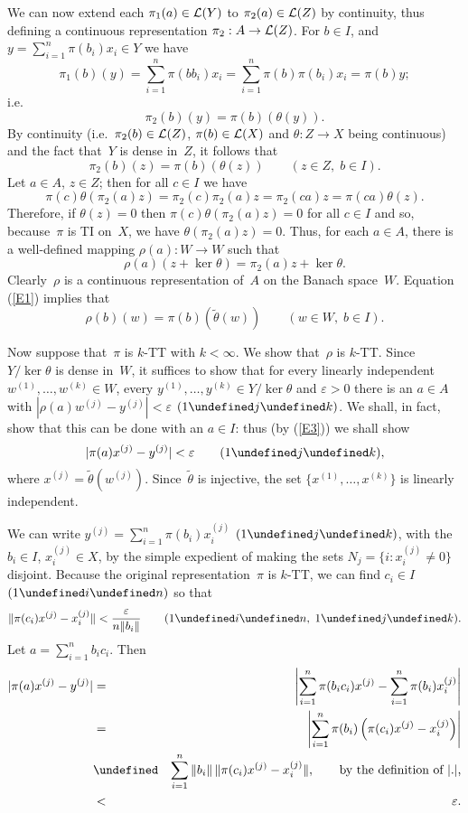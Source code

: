 \documentclass[11pt]{article}
\newcommand{\ie}{i.e.\ }
\let\leq\undefined  \let\geq\undefined
\let\le\leq   \let\ge\geq
\newcommand{\e}{\varepsilon}
\newenvironment{PoL}{{\it Proof of Lemma. }}{}
\newcommand{\nnY}[1]{|#1|}
\newcommand{\bignnY}[1]{\left|#1\right|}
\newcommand{\LX}{{\cal L}(X)}
\newcommand{\LY}{{\cal L}(Y)}
\newcommand{\LZ}{{\cal L}(Z)}
\begin{document}
\begin{PoL}
We can now extend each $\pi_1(a) \in \LY$ to $\pi_2(a) \in \LZ$ by
continuity, thus defining a continuous representation $\pi_2:A \to \LZ$.
For $b \in I$, and $y = \sum_{i=1}^n \pi(b_i)x_i \in Y$ we have
$$\pi_1(b)(y) = \sum_{i=1}^n \pi(bb_i)x_i
                  = \sum_{i=1}^n \pi(b)\pi(b_i)x_i
                  = \pi(b)y;$$
\ie
$$\pi_2(b)(y)   = \pi(b)(\theta(y)).$$
By continuity (\ie $\pi_2(b) \in \LZ$, $\pi(b) \in \LX$ and
$\theta:Z \to X$ being continuous) and the fact that~$Y$ is dense in~$Z$,
it follows that
\begin{equation} \label{E1}
\pi_2(b)(z) = \pi(b)(\theta(z)) \qquad (z \in Z,\; b \in I).
\end{equation}
Let $a \in A$, $z \in Z$; then for all $c \in I$  we have
$$\pi(c)\theta(\pi_2(a)z) = \pi_2(c)\pi_2(a)z = \pi_2(ca)z = \pi(ca)\theta(z).$$
Therefore, if $\theta(z)=0$ then $\pi(c)\theta(\pi_2(a)z) = 0$ for all $c \in I$
and so, because~$\pi$ is TI on~$X$, we have $\theta(\pi_2(a)z) = 0$.   Thus, for
each $a \in A$, there is a well-defined mapping $\rho(a):W \to W$ such that
$$\rho(a)(z + \ker\theta) = \pi_2(a)z + \ker\theta.$$
Clearly~$\rho$ is a continuous representation of~$A$ on the Banach space~$W$.
Equation (\ref{E1}) implies that
\begin{equation} \label{E3}
\rho(b)(w) = \pi(b)(\tilde\theta(w)) \qquad (w \in W,\; b \in I).
\end{equation}

Now suppose that~$\pi$ is $k$-TT with $k < \infty$.
We show that~$\rho$ is $k$-TT.  Since~$Y/\ker\theta$ is dense in~$W$, it
suffices to show that for every linearly independent
$w^{(1)},\dots,w^{(k)} \in W$, every $y^{(1)},\dots,y^{(k)} \in Y/\ker\theta$
and $\e > 0$ there is an $a \in A$ with
$\nnY{\rho(a)w^{(j)}- y^{(j)}} < \e$ $(1\le j\le k)$.    We shall, in fact,
show that this can be done with an $a \in I$: thus (by (\ref{E3})) we shall
show
$$\nnY{\pi(a)x^{(j)} - y^{(j)}} < \e\qquad(1\le j\le k),$$
where $x^{(j)} = \tilde\theta(w^{(j)})$.   Since~$\tilde\theta$ is injective,
the set $\{x^{(1)},\dots,x^{(k)}\}$ is linearly independent.

We can write $y^{(j)} = \sum_{i=1}^n \pi(b_i)x_i^{(j)}$ $(1\le j\le k)$, with
the $b_i\in I$,
$x_i^{(j)}\in X$, by the simple expedient of making the sets $N_j =
\{i:x_i^{(j)}\ne 0\}$ disjoint.  Because the original representation~$\pi$ is
$k$-TT, we can find $c_i \in I$ $(1 \le i \le n)$ so that
$$\|\pi(c_i)x^{(j)} - x_i^{(j)}\| < {\e\over n\|b_i\|}
                                \qquad (1 \le i \le n,\;1\le j\le k).$$
Let $a = \sum_{i=1}^n b_ic_i$.
Then
\begin{eqnarray*}
\nnY{\pi(a)x^{(j)} - y^{(j)}}
& = & \bignnY{\sum_{i=1}^n \pi(b_ic_i)x^{(j)} - \sum_{i=1}^n \pi(b_i)x_i^{(j)}}\\
& = & \bignnY{\sum_{i=1}^n \pi(b_i)\left(\pi(c_i)x^{(j)} - x_i^{(j)}\right)} \\
& \le & \sum_{i=1}^n \|b_i\|\,\|\pi(c_i)x^{(j)} - x_i^{(j)}\|, \qquad \mbox{by the definition of $\nnY{.}$,}\\
& < & \e.
\end{eqnarray*}


\end{PoL}
\end{document}
